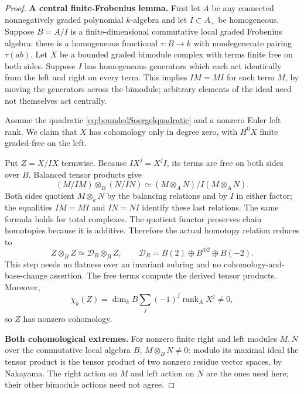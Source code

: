 \begin{proof}
\par\smallskip\noindent\textbf{A central finite-Frobenius lemma.}\quad
First let \(A\) be any connected nonnegatively graded polynomial
\(k\)-algebra and let \(I\subset A_+\) be homogeneous. Suppose
\(B=A/I\) is a finite-dimensional commutative local graded
Frobenius algebra: there is a homogeneous functional
\(\tau:B\to k\) with nondegenerate pairing \(\tau(ab)\).
Let \(X\) be a bounded graded bimodule complex with terms finite
free on both sides. Suppose \(I\) has homogeneous generators
which each act identically from the left and right on every term.
This implies \(IM=MI\) for each term \(M\), by moving the
generators across the bimodule; arbitrary elements of the ideal
need not themselves act centrally.

Assume the quadratic
\eqref{eq:boundedSoergelquadratic} and a nonzero Euler left
rank. We claim that \(X\) has cohomology only in degree zero,
with \(H^0X\) finite graded-free on the left.

Put \(Z=X/IX\) termwise. Because \(IX^j=X^jI\), its terms
are free on both sides over \(B\). Balanced tensor products give
\begin{equation}\label{eq:centralquotientmonoidal}
 (M/IM)\otimes_B(N/IN)
 \simeq(M\otimes_A N)/I(M\otimes_A N).
\end{equation}
Both sides quotient \(M\otimes_kN\) by the balancing relations
and by \(I\) in either factor; the equalities \(IM=MI\) and
\(IN=NI\) identify these last relations. The same formula holds
for total complexes. The quotient functor preserves chain
homotopies because it is additive. Therefore the actual
homotopy relation reduces to
\begin{equation}\label{eq:finiteFrobeniusquadratic}
 Z\otimes_B Z\simeq\mathscr D_B\otimes_B Z,
 \qquad\mathscr D_B=B(2)\oplus B^{\oplus2}\oplus B(-2).
\end{equation}
This step needs no flatness over an invariant subring and no
cohomology-and-base-change assertion. The free terms compute
the derived tensor products. Moreover,
\[
 \chi_k(Z)=\dim_kB\sum_j(-1)^j\operatorname{rank}_A X^j\ne0,
\]
so \(Z\) has nonzero cohomology.

\par\smallskip\noindent\textbf{Both cohomological extremes.}\quad
For nonzero finite right and left modules \(M,N\) over the
commutative local algebra \(B\),
\(M\otimes_BN\ne0\): modulo its maximal ideal the tensor
product is the tensor product of two nonzero residue vector
spaces, by Nakayama. The right action on \(M\) and left action
on \(N\) are the ones used here; their other bimodule actions
need not agree.


\end{proof}
